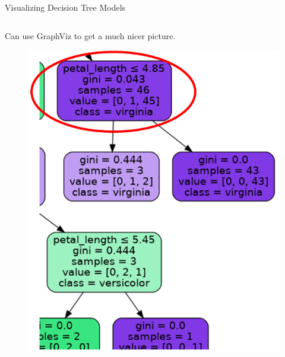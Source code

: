\documentclass[aspectratio=169]{../latex_main/tntbeamer}  %
\begin{document}
	
	\begin{frame}{Visualizing Decision Tree Models }
	    \begin{columns}
	        \begin{column}{.4\textwidth}
	        Can use GraphViz to get a much nicer picture.
	                \begin{figure}
	                    \includegraphics[scale=.3]{Bild25}
	                \end{figure}
	        \end{column}
	        

\end{columns}
\end{frame}
\end{document}

